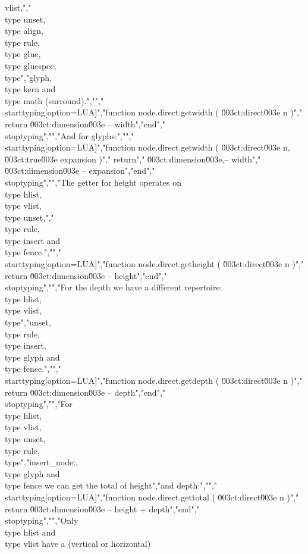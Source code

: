 {vlist},","\\type {unset}, \\type {align}, \\type {rule}, \\type {glue}, \\type {gluespec}, \\type","{glyph}, \\type {kern} and \\type {math} (surround).","","\\starttyping[option=LUA]","function node.direct.getwidth ( \u003ct:direct\u003e n )","    return \u003ct:dimension\u003e -- width","end","\\stoptyping","","And for glyphs:","","\\starttyping[option=LUA]","function node.direct.getwidth ( \u003ct:direct\u003e n, \u003ct:true\u003e expansion )","    return","        \u003ct:dimension\u003e,-- width","        \u003ct:dimension\u003e -- expansion","end","\\stoptyping","","The getter for height operates on \\type {hlist}, \\type {vlist}, \\type {unset},","\\type {rule}, \\type {insert} and \\type {fence}.","","\\starttyping[option=LUA]","function node.direct.getheight ( \u003ct:direct\u003e n )","    return \u003ct:dimension\u003e -- height","end","\\stoptyping","","For the depth we have a different repertoire: \\type {hlist}, \\type {vlist}, \\type","{unset}, \\type {rule}, \\type {insert}, \\type {glyph} and \\type {fence}.","","\\starttyping[option=LUA]","function node.direct.getdepth ( \u003ct:direct\u003e n )","    return \u003ct:dimension\u003e -- depth","end","\\stoptyping","","For \\type {hlist}, \\type {vlist}, \\type {unset}, \\type {rule}, \\type","{insert_node:}, \\type {glyph} and \\type {fence} we can get the total of height","and depth:","","\\starttyping[option=LUA]","function node.direct.gettotal ( \u003ct:direct\u003e n )","    return \u003ct:dimension\u003e -- height + depth","end","\\stoptyping","","Only \\type {hlist} and \\type {vlist} have a (vertical or horizontal) 